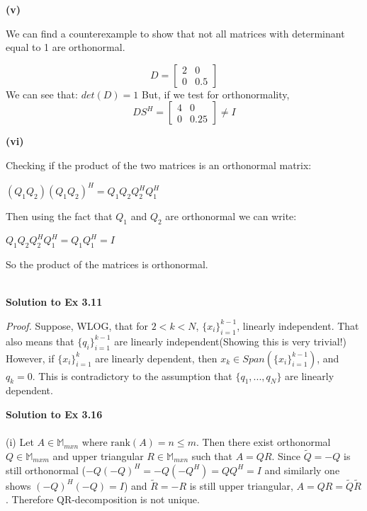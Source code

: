 \documentclass[letterpaper,12pt]{article}
\theoremstyle{definition}
\begin{document}
\begin{spacing}{1.3}{}
	\setlength{\leftskip}{10pt}
	
	\textbf{(v)}
	
	\setlength{\leftskip}{20pt}
	
	We can find a counterexample to show that not all matrices with determinant equal to 1 are orthonormal.
	
	\[D =
	\begin{bmatrix}
	2 & 0 \\
	0 & 0.5
	\end{bmatrix}
	\]
	We can see that:
	$det(D) = 1$
	But, if we test for orthonormality,
	\[DS^{H} =
	\begin{bmatrix}
	4 & 0 \\
	0 & 0.25
	\end{bmatrix} \neq I
	\]
	
	\setlength{\leftskip}{10pt}
	
	\textbf{(vi)}
	
	\setlength{\leftskip}{20pt}
	
	Checking if the product of the two matrices is an orthonormal matrix:
	
	$(Q_1Q_2)(Q_1Q_2)^H = Q_1Q_2Q_2^HQ_1^H$
	
	Then using the fact that $Q_1$ and $Q_2$ are orthonormal we can write:
	
	$Q_1Q_2Q_2^HQ_1^H = Q_1Q_1^H = I$
	
	So the product of the matrices is orthonormal. \\\\
	
	\setlength{\leftskip}{10pt}
	
	\textbf{Solution to Ex 3.11}
	
	\setlength{\leftskip}{20pt}
	
	\emph{Proof.} Suppose, WLOG, that for $2 < k < N$, $\{x_i \}_{i=1}^{k-1}$, linearly independent. That also means that $\{q_i\}_{i=1}^{k-1} $ are linearly independent(Showing this is very trivial!) \\
	However, if $\{x_i \}_{i=1}^{k}$ are linearly dependent, then $x_k \in Span(\{x_i \}_{i=1}^{k-1})$, and $q_k = 0$. This is contradictory to the assumption that $\{q_1, ..., q_N\}$ are linearly dependent.
	
	\setlength{\leftskip}{10pt}





\textbf{Solution to Ex 3.16} \\\\
	(i)
	Let $A\in\mathbb M_{mxn}$ where $\text{rank}(A)=n\leq m$.
	Then there exist orthonormal $Q\in\mathbb M_{mxm}$ and
	upper triangular $R\in\mathbb M_{mxn}$ such that $A=QR$.
	Since $\tilde{Q}=-Q$ is still orthonormal ($-Q(-Q)^H=-Q(-Q^H)=QQ^H=I$
	and similarly one shows $(-Q)^H(-Q)=I$)
	and $\tilde{R}=-R$ is still upper triangular,
	$A=QR=\tilde{Q}\tilde{R}$.
	Therefore QR-decomposition is not unique. \\\\
	

\end{spacing}
\end{document}
